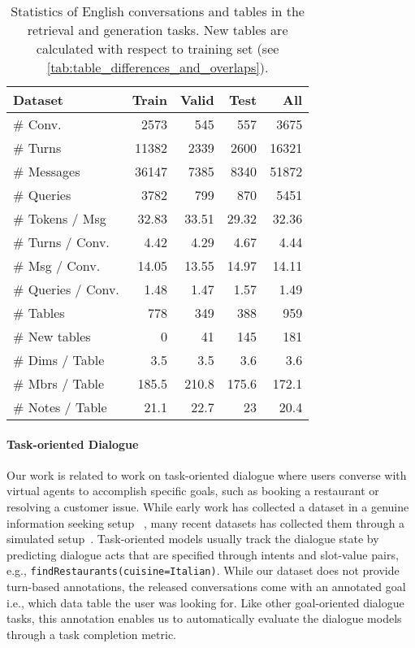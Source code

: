 \documentclass[11pt]{article}
\begin{document}
\begin{table}[t]
    \centering
    \small
    \begin{tabular}{lrrrr}
    \toprule
              Dataset &  Train &  Valid &  Test &   All \\
    \midrule
              \# Conv. &   2573 &    545 &   557 &  3675 \\
              \# Turns &  11382 &   2339 &  2600 & 16321 \\
           \# Messages &  36147 &   7385 &  8340 & 51872 \\
            \# Queries &   3782 &    799 &    870 &   5451 \\
       \# Tokens / Msg &  32.83 &  33.51 & 29.32 & 32.36 \\
      \# Turns / Conv. &   4.42 &   4.29 &  4.67 &  4.44 \\
        \# Msg / Conv. &  14.05 &  13.55 & 14.97 & 14.11 \\
    \# Queries / Conv. &   1.48 &   1.47 &   1.57 &   1.49 \\
         \midrule
             \# Tables &    778 &    349 &   388 &   959 \\
         \# New tables &      0 &     41 &   145 &   181 \\
       \# Dims / Table &    3.5 &    3.5 &   3.6 &   3.6 \\
       \# Mbrs / Table &  185.5 &  210.8 & 175.6 & 172.1 \\
      \# Notes / Table &   21.1 &   22.7 &    23 &  20.4 \\
    \bottomrule
    \end{tabular}

    \caption{Statistics of English conversations and tables in the retrieval and generation tasks. New tables are calculated with respect to training set (see \autoref{tab:table_differences_and_overlaps}). \vspace{-3mm}}
    \label{tab:table_conversation_statistics}
\end{table}

\paragraph{Task-oriented Dialogue} Our work is related to work on task-oriented dialogue where users converse with virtual agents to accomplish specific goals, such as booking a restaurant or resolving a customer issue. While early work has collected a dataset in a genuine information seeking setup
~\cite{hemphill_atis_1990}, many recent datasets has collected them through a simulated setup~\cite{budzianowski-etal-2018-multiwoz, rastogi2020towards, feng2020doc2dial, Feng2021MultiDoc2DialMD, chen-etal-2021-action, lee2021sgd}. Task-oriented models usually track the dialogue state by predicting dialogue acts that are specified through intents and slot-value pairs, e.g., \texttt{findRestaurants(cuisine=Italian)}. While our dataset does not provide turn-based annotations, the released conversations come with an annotated goal i.e., which data table the user was looking for. Like other goal-oriented dialogue tasks, this annotation enables us to automatically evaluate the dialogue models through a task completion metric.   
\end{document}
